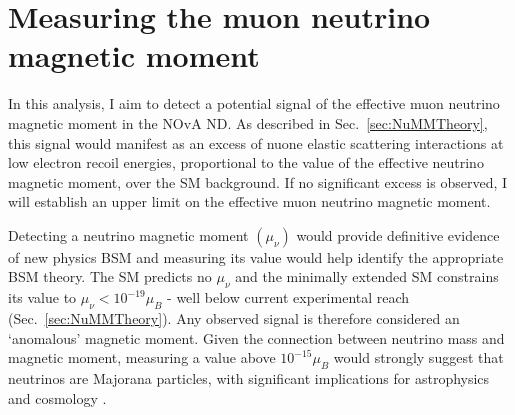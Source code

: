 \chapter{Measuring the muon neutrino magnetic moment}\label{sec:NeutrinoMagMoment}

In this analysis, I aim to detect a potential signal of the effective muon neutrino magnetic moment in the \gls{NOvA} \gls{ND}. As described in Sec.~\ref{sec:NuMMTheory}, this signal would manifest as an excess of \gls{nuone} elastic scattering interactions at low electron recoil energies, proportional to the value of the effective neutrino magnetic moment, over the \gls{SM} background. If no significant excess is observed, I will establish an upper limit on the effective muon neutrino magnetic moment.



Detecting a neutrino magnetic moment $\left(\mu_\nu\right)$ would provide definitive evidence of new physics \gls{BSM} and measuring its value would help identify the appropriate \gls{BSM} theory. The \gls{SM} predicts no $\mu_\nu$ and the minimally extended \gls{SM} constrains its value to $\mu_\nu<10^{-19}\mu_B$ - well below current experimental reach (Sec.~\ref{sec:NuMMTheory}). Any observed signal is therefore considered an `anomalous' magnetic moment. Given the connection between neutrino mass and magnetic moment, measuring a value above $10^{-15}\mu_B$ would strongly suggest that neutrinos are Majorana particles, with significant implications for astrophysics and cosmology \cite{SnowmassNeutrinoFrontierReport.pdf}.




